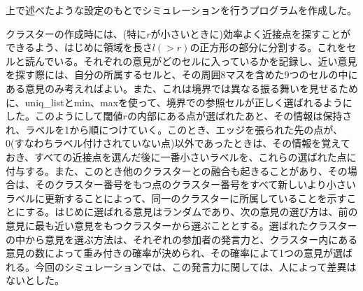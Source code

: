 \documentclass[letterpaper,10pt,english]{sphinxmanual}
\begin{document}
上で述べたような設定のもとでシミュレーションを行うプログラムを作成した。

クラスターの作成時には、(特に\(r\)が小さいときに)効率よく近接点を探すことができるよう、はじめに領域を長さ\(l(>r)\)の正方形の部分に分割する。これをセルと読んでいる。それぞれの意見がどのセルに入っているかを記録し、近い意見を探す際には、自分の所属するセルと、その周囲8マスを含めた9つのセルの中にある意見のみ考えればよい。また、これは境界では異なる振る舞いを見せるために、uniq\_listとmin、maxを使って、境界での参照セルが正しく選ばれるようにした。このようにして閾値\(r\)の内部にある点が選ばれたあと、その情報は保持され、ラベルを1から順につけていく。このとき、エッジを張られた先の点が、0(すなわちラベル付けされていない点)以外であったときは、その情報を覚えておき、すべての近接点を選んだ後に一番小さいラベルを、これらの選ばれた点に付与する。また、このとき他のクラスターとの融合も起きることがあり、その場合は、そのクラスター番号をもつ点のクラスター番号をすべて新しいより小さいラベルに更新することによって、同一のクラスターに所属していることを示すことにする。はじめに選ばれる意見はランダムであり、次の意見の選び方は、前の意見に最も近い意見をもつクラスターから選ぶこととする。選ばれたクラスターの中から意見を選ぶ方法は、それぞれの参加者の発言力と、クラスター内にある意見の数によって重み付きの確率が決められ、その確率によて1つの意見が選ばれる。今回のシミュレーションでは、この発言力に関しては、人によって差異はないとした。
\end{document}
